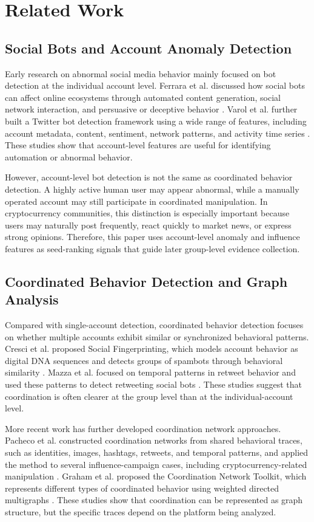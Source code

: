 \documentclass[conference]{IEEEtran}
\begin{document}
\section{Related Work}
\subsection{Social Bots and Account Anomaly Detection}
Early research on abnormal social media behavior mainly focused on bot detection at the individual account level. Ferrara et al. discussed how social bots can affect online ecosystems through automated content generation, social network interaction, and persuasive or deceptive behavior \cite{b1}. Varol et al. further built a Twitter bot detection framework using a wide range of features, including account metadata, content, sentiment, network patterns, and activity time series \cite{b2}. These studies show that account-level features are useful for identifying automation or abnormal behavior.

However, account-level bot detection is not the same as coordinated behavior detection. A highly active human user may appear abnormal, while a manually operated account may still participate in coordinated manipulation. In cryptocurrency communities, this distinction is especially important because users may naturally post frequently, react quickly to market news, or express strong opinions. Therefore, this paper uses account-level anomaly and influence features as seed-ranking signals that guide later group-level evidence collection.

\subsection{Coordinated Behavior Detection and Graph Analysis}
Compared with single-account detection, coordinated behavior detection focuses on whether multiple accounts exhibit similar or synchronized behavioral patterns. Cresci et al. proposed Social Fingerprinting, which models account behavior as digital DNA sequences and detects groups of spambots through behavioral similarity \cite{b3}. Mazza et al. focused on temporal patterns in retweet behavior and used these patterns to detect retweeting social bots \cite{b4}. These studies suggest that coordination is often clearer at the group level than at the individual-account level.

More recent work has further developed coordination network approaches. Pacheco et al. constructed coordination networks from shared behavioral traces, such as identities, images, hashtags, retweets, and temporal patterns, and applied the method to several influence-campaign cases, including cryptocurrency-related manipulation \cite{b5}. Graham et al. proposed the Coordination Network Toolkit, which represents different types of coordinated behavior using weighted directed multigraphs \cite{b6}. These studies show that coordination can be represented as graph structure, but the specific traces depend on the platform being analyzed.
\end{document}
